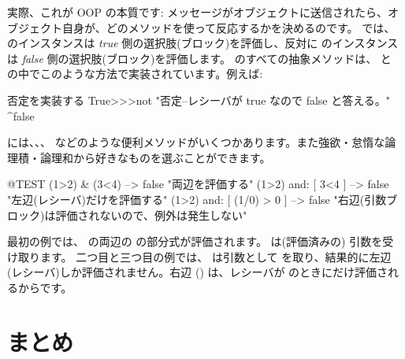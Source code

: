 \documentclass[a4paper,10pt,twoside]{book}
\begin{document}
実際、これが OOP の本質です: メッセージがオブジェクトに送信されたら、オブジェクト自身が、どのメソッドを使って反応するかを決めるのです。 では、 のインスタンスは \emph{true} 側の選択肢(ブロック)を評価し、反対に  のインスタンスは \emph{false} 側の選択肢(ブロック)を評価します。 のすべての抽象メソッドは、 と  の中でこのような方法で実装されています。例えば:

\begin{method}{否定を実装する}
True>>>not
    "否定--レシーバが true なので false と答える。"
    ^false
\end{method}

 には、、、 などのような便利メソッドがいくつかあります。また強欲・怠惰な論理積・論理和から好きなものを選ぶことができます。

\begin{code}{@TEST}
(1>2) & (3<4)              --> false    "両辺を評価する"
(1>2) and: [ 3<4 ]        --> false    "左辺(レシーバ)だけを評価する"
(1>2) and: [ (1/0) > 0 ] --> false    "右辺(引数ブロック)は評価されないので、例外は発生しない"
\end{code}

最初の例では、 の両辺の  の部分式が評価されます。\ct{&} は(評価済みの)  引数を受け取ります。
二つ目と三つ目の例では、 は引数として  を取り、結果的に左辺(レシーバ)しか評価されません。右辺 () は、レシーバが  のときにだけ評価されるからです。


\section{まとめ}
\end{document}
